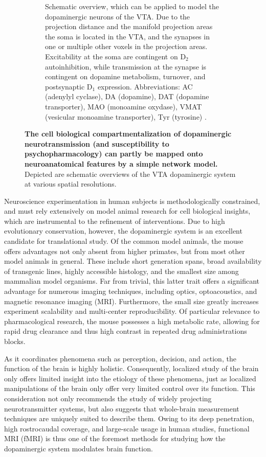 \begin{sansmath}
\begin{figure}[h!]
\begin{subfigure}{.985\textwidth}
		\caption{
			Schematic overview, which can be applied to model the dopaminergic neurons of the VTA.
			Due to the projection distance and the manifold projection areas the soma is located in the VTA, and the synapses in one or multiple other voxels in the projection areas.
			Excitability at the soma are contingent on $\mathrm{D_2}$ autoinhibition, while transmission at the synapse is contingent on dopamine metabolism, turnover, and postsynaptic $\mathrm{D_1}$ expression.
			Abbreviations: AC (adenylyl cyclase), DA (dopamine), DAT (dopamine transporter), MAO (monoamine oxydase), VMAT (vesicular monoamine transporter), Tyr (tyrosine) \cite{Torres2003}.
			}
		\label{fig:cm}
	\end{subfigure}
	\caption{
		\textbf{The cell biological compartmentalization of dopaminergic neurotransmission (and susceptibility to psychopharmacology) can partly be mapped onto neuroanatomical features by a simple network model.}
		Depicted are schematic overviews of the VTA dopaminergic system at various spatial resolutions.
		}
	\label{fig:m}
\end{figure}
\end{sansmath}

Neuroscience experimentation in human subjects is methodologically constrained, and must rely extensively on model animal research for cell biological insights, which are instrumental to the refinement of interventions.
Due to high evolutionary conservation, however, the dopaminergic system is an excellent candidate for translational study.
Of the common model animals, the mouse offers advantages not only absent from higher primates, but from most other model animals in general.
These include short generation spans, broad availability of transgenic lines, highly accessible histology, and the smallest size among mammalian model organisms.
Far from trivial, this latter trait offers a significant advantage for numerous imaging techniques, including optics, optoacoustics, and magnetic resonance imaging (MRI).
Furthermore, the small size greatly increases experiment scalability and multi-center reproducibility.
Of particular relevance to pharmacological research, the mouse possesses a high metabolic rate, allowing for rapid drug clearance and thus high contrast in repeated drug administrations blocks.

As it coordinates phenomena such as perception, decision, and action, the function of the brain is highly holistic.
Consequently, localized study of the brain only offers limited insight into the etiology of these phenomena, just as localized manipulations of the brain only offer very limited control over its function.
This consideration not only recommends the study of widely projecting neurotransmitter systems, but also suggests that whole-brain measurement techniques are uniquely suited to describe them.
Owing to its deep penetration, high rostrocaudal coverage, and large-scale usage in human studies, functional MRI (fMRI) is thus one of the foremost methods for studying how the dopaminergic system modulates brain function.

